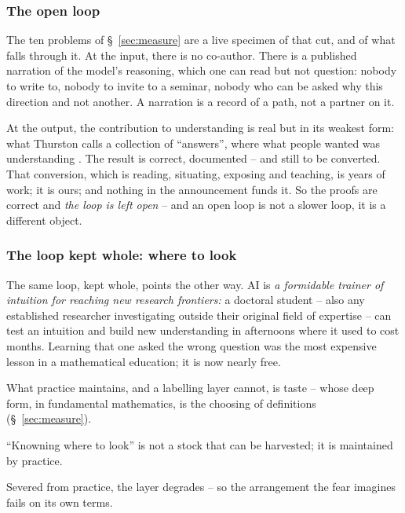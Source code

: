 \documentclass[11pt, a4paper,twosided]{amsart}
\newcommand{\key}[1]{\emph{#1}}
\begin{document}
\subsubsection{The open loop}


The ten problems of \S~\ref{sec:measure} are a live specimen of that cut, and of what falls through it. At the input, there is no co-author. There is a published narration of the model's reasoning, which one can read but not question: nobody to write to, nobody to invite to a seminar, nobody who can be asked why this direction and not another. A narration is a record of a path, not a partner on it.

At the output, the contribution to understanding is real but in its weakest form: what Thurston calls a collection of ``answers'', where what people wanted was understanding \cite[\S~1]{thurston1994}. The result is correct, documented -- and still to be converted. That conversion, which is reading, situating, exposing and teaching, is years of work; it is ours; and nothing in the announcement funds it. So the proofs are correct and \key{the loop is left open} -- and an open loop is not a slower loop, it is a different object.


\subsubsection{The loop kept whole: where to look}

The same loop, kept whole, points the other way. AI is \emph{a formidable trainer of intuition for reaching new research frontiers:} a doctoral student -- also any established researcher investigating outside their original field of expertise -- can test an intuition and build new understanding in afternoons where it used to cost months. Learning that one asked the wrong question was the most expensive lesson in a mathematical education; it is now nearly free.

What practice maintains, and a labelling layer cannot, is taste -- whose deep form, in fundamental mathematics, is the choosing of definitions (\S~\ref{sec:measure}).

\begin{pullquote}
  ``Knowning where to look'' is not a stock that can be harvested; it is maintained by practice. 
\end{pullquote}

Severed from practice, the layer degrades -- so the arrangement the fear imagines fails on its own terms.
\end{document}
